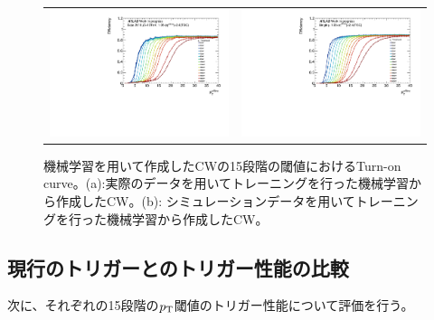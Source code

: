 \begin{figure}
    \begin{tabular}{cc}
    \begin{minipage}[b]{0.45\hsize}
        \hspace*{-1cm}
        \includegraphics[clip, width=8cm]{fig/5/15_v06_Data.pdf}
        \subcaption{}
        \label{fig:15Eff_CW_Data}
    \end{minipage}&
    \begin{minipage}[b]{0.45\hsize}
        \includegraphics[clip, width=8cm]{fig/5/15_MC_MC.pdf}
        \subcaption{}
        \label{fig:15Eff_CW_Simu}
    \end{minipage}
    \end{tabular}
    \caption{機械学習を用いて作成したCWの15段階の閾値におけるTurn-on curve。(a):実際のデータを用いてトレーニングを行った機械学習から作成したCW。(b): シミュレーションデータを用いてトレーニングを行った機械学習から作成したCW。}
    \label{}
\end{figure}


\subsection{現行のトリガーとのトリガー性能の比較}
次に、それぞれの15段階の$p_{\rm{T}}$閾値のトリガー性能について評価を行う。

